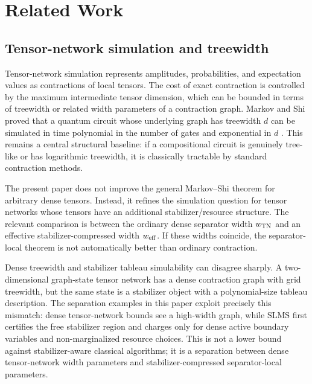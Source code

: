 \section{Related Work}
\label{sec:related}

\subsection{Tensor-network simulation and treewidth}

Tensor-network simulation represents amplitudes, probabilities, and expectation values as contractions of local tensors. The cost of exact contraction is controlled by the maximum intermediate tensor dimension, which can be bounded in terms of treewidth or related width parameters of a contraction graph. Markov and Shi proved that a quantum circuit whose underlying graph has treewidth \(d\) can be simulated in time polynomial in the number of gates and exponential in \(d\) \citep{MarkovShi2008}. This remains a central structural baseline: if a compositional circuit is genuinely tree-like or has logarithmic treewidth, it is classically tractable by standard contraction methods.

The present paper does not improve the general Markov--Shi theorem for arbitrary dense tensors. Instead, it refines the simulation question for tensor networks whose tensors have an additional stabilizer/resource structure. The relevant comparison is between the ordinary dense separator width \(w_{\mathrm{TN}}\) and an effective stabilizer-compressed width \(w_{\mathrm{eff}}\). If these widths coincide, the separator-local theorem is not automatically better than ordinary contraction.

Dense treewidth and stabilizer tableau simulability can disagree sharply. A two-dimensional graph-state tensor network has a dense contraction graph with grid treewidth, but the same state is a stabilizer object with a polynomial-size tableau description. The separation examples in this paper exploit precisely this mismatch: dense tensor-network bounds see a high-width graph, while SLMS first certifies the free stabilizer region and charges only for dense active boundary variables and non-marginalized resource choices. This is not a lower bound against stabilizer-aware classical algorithms; it is a separation between dense tensor-network width parameters and stabilizer-compressed separator-local parameters.

